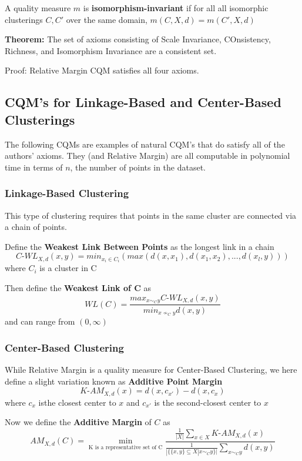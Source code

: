 \medskip

A quality measure $m$ is \textbf{isomorphism-invariant} if for all all isomorphic clusterings $C,C'$ over the same domain, $m(C,X,d)=m(C',X,d)$

\medskip

\textbf{Theorem:} The set of axioms consisting of Scale Invariance, COnsistency, Richness, and Isomorphism Invariance are a consistent set.

\smallskip

Proof: Relative Margin CQM satisfies all four axioms. 

\subsection*{CQM's for Linkage-Based and Center-Based Clusterings}

The following CQMs are examples of natural CQM's that do satisfy all of the authors' axioms. They (and Relative Margin) are all computable in polynomial time in terms of $n$, the number of points in the dataset. 

\subsubsection*{Linkage-Based Clustering}

This type of clustering requires that points in the same cluster are connected via a chain of points. 

\medskip

Define the \textbf{Weakest Link Between Points} as the longest link in a chain $$C\text{-}WL_{X,d}(x,y)=min_{x_i\in C_i} (max(d(x,x_1),d(x_1,x_2),...,d(x_l,y)))$$ where $C_i$ is a cluster in C

\medskip

Then define the \textbf{Weakest Link of C} as $$WL(C)=\frac{max_{x\sim_C y}C\text{-}WL_{X,d}(x,y)}{min_{x\nsim_C y}d(x,y)}$$ and can range from $(0,\infty)$

\subsubsection*{Center-Based Clustering}

While Relative Margin is a quality measure for Center-Based Clustering, we here define a slight variation known as \textbf{Additive Point Margin} $$K\text{-}AM_{X,d}(x)=d(x,c_{x'})-d(x,c_x)$$ where $c_x$ isthe closest center to $x$ and $c_{x'}$ is the second-closest center to $x$

Now we define the \textbf{Additive Margin} of $C$ as $$AM_{X,d}(C)=\min_{\text{K is a representative set of C}}\frac{\frac{1}{|X|}\sum_{x\in X}K\text{-}AM_{X,d}(x)}{\frac{1}{|\{\{x,y\}\subseteq X|x\sim_C y\}|}\sum_{x\sim_C y} d(x,y)}$$